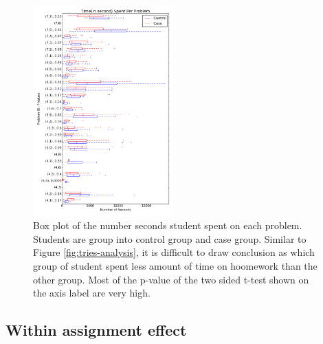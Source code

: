 \documentclass{sigchi}
\begin{document}
\begin{figure}[ht]
  \centering
\includegraphics[width=0.48\textwidth]{image/problem_time.png}
  \caption{Box plot of the number seconds student spent on each problem. Students are group into control group and case group. Similar to Figure \ref{fig:tries-analysis}, it is difficult to draw conclusion as which group of student spent less amount of time on hoomework than the other group. Most of the p-value of the two sided t-test shown on the axis label are very high.}
   \label{fig:time_analysis}
\end{figure}

\subsection{Within assignment effect}
\end{document}
